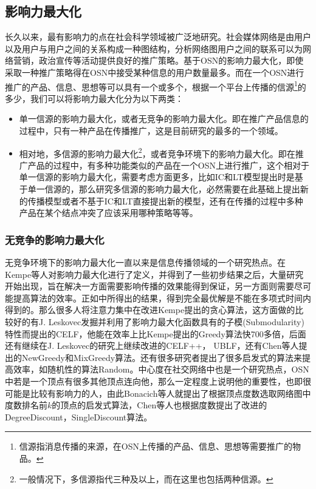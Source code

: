 \subsection{影响力最大化}
长久以来，最有影响力的点在社会科学领域被广泛地研究\cite{lu2011leaders}\cite{qing2013new}\cite{zhuo2013node}\cite{kitsak2010identification}。社会媒体网络是由用户以及用户与用户之间的关系构成一种图结构，分析网络图用户之间的联系可以为网络营销，政治宣传等活动提供良好的推广策略。基于OSN的影响力最大化，即使采取一种推广策略得在OSN中接受某种信息的用户数量最多。而在一个OSN进行推广的产品、信息、思想等可以具有一个或多个，根据一个平台上传播的信源\footnote{信源指消息传播的来源，在OSN上传播的产品、信息、思想等需要推广的物品。}的多少，我们可以将影响力最大化分为以下两类：
\begin{itemize}
\item 单一信源的影响力最大化，或者无竞争的影响力最大化。即在推广产品信息的过程中，只有一种产品在传播推广，这是目前研究的最多的一个领域。
\item 相对地，多信源的影响力最大化\footnote{一般情况下，多信源指代三种及以上，而在这里也包括两种信源。}，或者竞争环境下的影响力最大化。即在推广产品的过程中，有多种功能类似的产品在一个OSN上进行推广，这个相对于单一信源的影响力最大化，需要考虑方面更多，比如IC和LT模型提出时是基于单一信源的，那么研究多信源的影响力最大化，必然需要在此基础上提出新的传播模型或者不基于IC和LT直接提出新的模型，还有在传播的过程中多种产品在某个结点冲突了应该采用哪种策略等等。
\end{itemize}


\subsubsection{无竞争的影响力最大化}
无竞争环境下的影响力最大化一直以来是信息传播领域的一个研究热点。在Kempe\cite{kempe2003maximizing}等人对影响力最大化进行了定义，并得到了一些初步结果之后，大量研究开始出现，旨在解决一方面需要影响传播的效果能得到保证，另一方面则需要尽可能提高算法的效率。正如\cite{kempe2003maximizing}中所得出的结果，得到完全最优解是不能在多项式时间内得到的。那么很多人将注意力集中在改进Kempe提出的贪心算法，这方面做的比较好的有J. Leskovec\cite{leskovec2007cost}发掘并利用了影响力最大化函数具有的子模(Submodularity)特性而提出的CELF，他能在效率上比Kempe提出的Greedy算法快700多倍，后面还有继续在J. Leskovec的研究上继续改进的CELF++\cite{goyal2011celf++}， UBLF\cite{zhou2013ublf}，还有Chen\cite{chen2009efficient}等人提出的NewGreedy和MixGreedy算法。还有很多研究者提出了很多启发式的算法来提高效率，如随机性的算法Random\cite{kempe2003maximizing}\cite{chen2009efficient}。中心度在社交网络中也是一个研究热点，OSN中若是一个顶点有很多其他顶点连向他，那么一定程度上说明他的重要性，也即很可能是比较有影响力的人，由此Bonacich\cite{bonacich1972factoring}等人就提出了根据顶点度数选取网络图中度数排名前$k$的顶点的启发式算法，Chen\cite{chen2009efficient}等人也根据度数提出了改进的DegreeDiscount，SingleDiscount算法。


